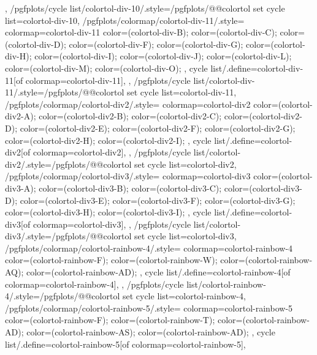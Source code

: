 {{  },
  /pgfplots/cycle list/colortol-div-10/.style={/pgfplots/@@colortol set cycle list={colortol-div-10}},
  /pgfplots/colormap/colortol-div-11/.style={
    colormap={colortol-div-11}{
      color=(colortol-div-B);
      color=(colortol-div-C);
      color=(colortol-div-D);
      color=(colortol-div-F);
      color=(colortol-div-G);
      color=(colortol-div-H);
      color=(colortol-div-I);
      color=(colortol-div-J);
      color=(colortol-div-L);
      color=(colortol-div-M);
      color=(colortol-div-O);
    },
    cycle list/.define={colortol-div-11}{[of colormap=colortol-div-11]},
  },
  /pgfplots/cycle list/colortol-div-11/.style={/pgfplots/@@colortol set cycle list={colortol-div-11}},
  /pgfplots/colormap/colortol-div2/.style={
    colormap={colortol-div2}{
      color=(colortol-div2-A);
      color=(colortol-div2-B);
      color=(colortol-div2-C);
      color=(colortol-div2-D);
      color=(colortol-div2-E);
      color=(colortol-div2-F);
      color=(colortol-div2-G);
      color=(colortol-div2-H);
      color=(colortol-div2-I);
    },
    cycle list/.define={colortol-div2}{[of colormap=colortol-div2]},
  },
  /pgfplots/cycle list/colortol-div2/.style={/pgfplots/@@colortol set cycle list={colortol-div2}},
  /pgfplots/colormap/colortol-div3/.style={
    colormap={colortol-div3}{
      color=(colortol-div3-A);
      color=(colortol-div3-B);
      color=(colortol-div3-C);
      color=(colortol-div3-D);
      color=(colortol-div3-E);
      color=(colortol-div3-F);
      color=(colortol-div3-G);
      color=(colortol-div3-H);
      color=(colortol-div3-I);
    },
    cycle list/.define={colortol-div3}{[of colormap=colortol-div3]},
  },
  /pgfplots/cycle list/colortol-div3/.style={/pgfplots/@@colortol set cycle list={colortol-div3}},
  /pgfplots/colormap/colortol-rainbow-4/.style={
    colormap={colortol-rainbow-4}{
      color=(colortol-rainbow-F);
      color=(colortol-rainbow-W);
      color=(colortol-rainbow-AQ);
      color=(colortol-rainbow-AD);
    },
    cycle list/.define={colortol-rainbow-4}{[of colormap=colortol-rainbow-4]},
  },
  /pgfplots/cycle list/colortol-rainbow-4/.style={/pgfplots/@@colortol set cycle list={colortol-rainbow-4}},
  /pgfplots/colormap/colortol-rainbow-5/.style={
    colormap={colortol-rainbow-5}{
      color=(colortol-rainbow-F);
      color=(colortol-rainbow-T);
      color=(colortol-rainbow-AD);
      color=(colortol-rainbow-AS);
      color=(colortol-rainbow-AD);
    },
    cycle list/.define={colortol-rainbow-5}{[of colormap=colortol-rainbow-5]},
}}
